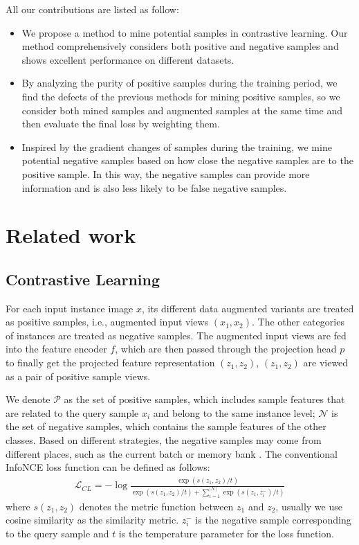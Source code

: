 \documentclass[review]{elsarticle}
\begin{document}
All our contributions are listed as follow:
\begin{itemize}
\item We propose a method to mine potential samples in contrastive learning. Our method comprehensively considers both positive and negative samples and shows excellent performance on different datasets.
\item  
By analyzing the purity of positive samples during the training period, we find the defects of the previous methods for mining positive samples, so we consider both mined samples and augmented samples at the same time and  then evaluate the final loss by weighting them.
\item Inspired by the gradient changes of samples during the training, we mine potential negative samples based on how close the negative samples are to the positive sample. In this way, the negative samples can provide more information and is also less likely to be false negative samples.
\end{itemize}



\section{Related work}
 \subsection{Contrastive Learning}
 For each input instance image $x$, its different data augmented variants are treated as positive samples, i.e., augmented input views $(x_1,x_2)$. The other categories of instances are treated as negative samples. The augmented input views are fed into the feature encoder $f$, which are then passed through the projection head $p$ to finally get the projected feature representation $(z_1,z_2)$, $(z_1,z_2)$ are viewed as a pair of positive sample views. 

We denote $\mathcal{P}$ as the set of positive samples, which includes sample features that are related to the query sample $x_i$ and belong to the same instance level; $\mathcal{N}$ is the set of negative samples, which contains the sample features of the other classes. Based on different strategies, the negative samples may come from different places, such as the current batch or memory bank \cite{b3,b4,b5}. The conventional InfoNCE loss function can be defined as follows: 
\begin{equation}
\begin{aligned}
\mathcal{L} _{CL}= 
 -\log\frac{  \exp(s( z_1,z_2)/t )           }    { \exp(s( z_1,z_2)/t )
     +\sum_{i=1}^{\left |\mathcal{N}\right |}\exp(s( z_1,z_i^{-})/t )}   
\label{equation1}
\end{aligned}
\end{equation}
where $s(z_1,z_2)$ denotes the metric function between $z_1$ and $z_2$, usually we use cosine similarity as the similarity metric. $z_i^{-}$ is the negative sample corresponding to the query sample and  $t$ is the temperature parameter for the loss function.
\end{document}
